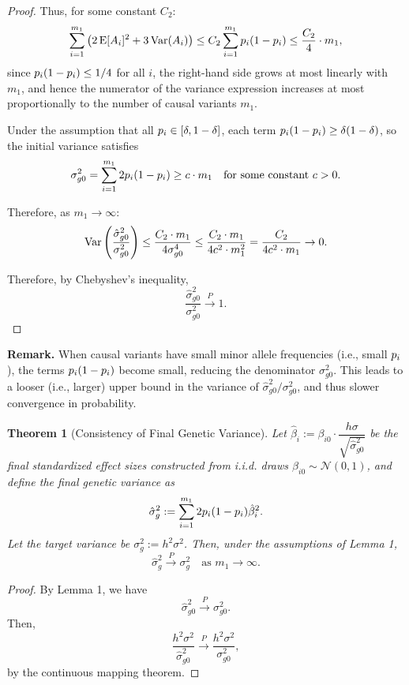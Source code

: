 \documentclass[11pt]{article}
\newtheorem{theorem}{Theorem}
\begin{document}
\begin{appendices}
\begin{proof}
Thus, for some constant \( C_2\): 
\[
\sum_{i=1}^{m_1} \left( 2 \operatorname{E}[A_i]^2 + 3 \operatorname{Var}(A_i) \right) \leq C_2 \sum_{i=1}^{m_1}  p_{i}  (1 -  p_{i}  ) \leq \frac{C_2}{4} \cdot m_1,
\]
since \(  p_{i}  (1 -  p_{i}  ) \leq 1/4 \) for all \( i \), the right-hand side grows at most linearly with \( m_1 \), and hence the numerator of the variance expression increases at most proportionally to the number of causal variants $m_1$.

Under the assumption that all \(  p_{i}   \in [\delta, 1 - \delta] \), each term \(  p_{i}  (1 -  p_{i}  ) \geq \delta(1 - \delta) \), so the initial variance satisfies
\[
\sigma_{g0}^2 = \sum_{i=1}^{m_1} 2 p_{i}  (1 -  p_{i}  ) \geq c \cdot m_1 \quad \text{for some constant } c > 0.
\]

Therefore, as $m_1 \to \infty$:
\[
\operatorname{Var} \left( \frac{\hat{\sigma}_{g0}^2}{\sigma_{g0}^2} \right)
\leq \frac{C_2 \cdot m_1}{4\sigma_{g0}^4} \leq \frac{C_2 \cdot m_1}{4c^2 \cdot m_1^2} = \frac{C_2}{4c^2 \cdot m_1} \to 0.
\]


Therefore, by Chebyshev’s inequality,
\[
\frac{\hat{\sigma}_{g0}^2}{\sigma_{g0}^2} \xrightarrow{P} 1.
\]
\end{proof}

\textbf{Remark.} When causal variants have small minor allele frequencies (i.e., small \(  p_{i}   \)), the terms \(  p_{i}  (1 -  p_{i}  ) \) become small, reducing the denominator \( \sigma_{g0}^2 \). This leads to a looser (i.e., larger) upper bound in the variance of \( \hat{\sigma}_{g0}^2 / \sigma_{g0}^2 \), and thus slower convergence in probability.



\begin{theorem}[Consistency of Final Genetic Variance]
Let \( \hat{\beta}_i := \beta_{i0} \cdot \dfrac{h\sigma}{\sqrt{\hat{\sigma}_{g0}^2}} \) be the final standardized effect sizes constructed from i.i.d. draws \( \beta_{i0} \sim \mathcal{N}(0, 1) \), and define the final genetic variance as
\[
\hat{\sigma}_g^2 := \sum_{i=1}^{m_1} 2 p_{i}  (1 -  p_{i}  ) \hat{\beta}_i^2.
\]
Let the target variance be \( \sigma_g^2 := h^2 \sigma^2 \). Then, under the assumptions of Lemma 1,
\[
\hat{\sigma}_g^2 \xrightarrow{P} \sigma_g^2 \quad \text{as } m_1 \to \infty.
\]
\end{theorem}

\begin{proof}
By Lemma 1, we have
\[
\hat{\sigma}_{g0}^2 \xrightarrow{P} \sigma_{g0}^2.
\]
Then,
\[
\frac{h^2 \sigma^2}{\hat{\sigma}_{g0}^2} \xrightarrow{P} \frac{h^2 \sigma^2}{\sigma_{g0}^2},
\]
by the continuous mapping theorem.


\end{proof}
\end{appendices}
\end{document}
